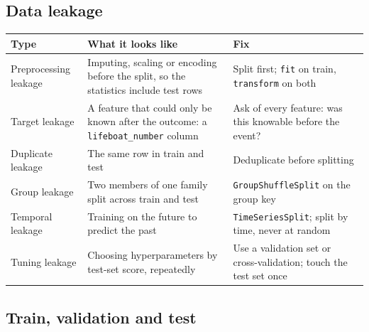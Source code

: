 \documentclass[11pt,a4paper]{article}
\begin{document}
\subsection{Data leakage}



\begin{tabularx}{\textwidth}{@{}l X X@{}}
\toprule
\rowcolor{tablehead} \textbf{Type} & \textbf{What it looks like} & \textbf{Fix} \\
\midrule
Preprocessing leakage & Imputing, scaling or encoding before the split, so the statistics include test rows & Split first; \lstinline|fit| on train, \lstinline|transform| on both \\
Target leakage & A feature that could only be known after the outcome: a \texttt{lifeboat\_number} column & Ask of every feature: was this knowable before the event? \\
Duplicate leakage & The same row in train and test & Deduplicate before splitting \\
Group leakage & Two members of one family split across train and test & \lstinline|GroupShuffleSplit| on the group key \\
Temporal leakage & Training on the future to predict the past & \lstinline|TimeSeriesSplit|; split by time, never at random \\
Tuning leakage & Choosing hyperparameters by test-set score, repeatedly & Use a validation set or cross-validation; touch the test set once \\
\bottomrule
\end{tabularx}



\subsection{Train, validation and test}
\end{document}
